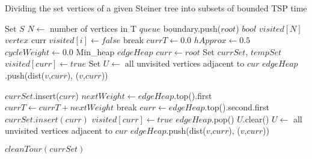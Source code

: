 \begin{algorithm}
\caption{Dividing the set vertices of a given Steiner tree into subsets of bounded TSP time}\label{euclid}
\begin{algorithmic}
\State Set  $S$
\State $N \gets$ number of vertices in T
\State $queue$ boundary.push($root$) 
\State $bool$ $visited[N]$
\State $vertex$ curr 
	\State $visited[i] \gets false$ 
\EndFor
{}
		\State break
	\EndIf
	\State $currT \gets 0.0$ 
	\State $hApprox \gets 0.5$ 
	\State $cycleWeight \gets 0.0$ 
	\State Min\_heap $edgeHeap$  
	\State $curr \gets root$ 
	\State Set $currSet$, $tempSet$ 
	\State $visited[curr] \gets true$ 
	\State Set $U \gets$ all unvisited vertices adjacent to $cur$ 
		\State $edgeHeap$.push(dist($v$,$curr$), ($v$,$curr$)) 
	\EndFor

	\State $currSet$.insert($curr$) 
		\State $nextWeight \gets edgeHeap$.top().first 
		\State $currT \gets currT + nextWeight$ 
			break 
		\EndIf
		\State $curr \gets edgeHeap$.top().second.first 
		\State $currSet.insert(curr)$ 
		\State $visited[curr] \gets true$ 
		\State $edgeHeap$.pop() 
		\State $U$.clear() 
		\State $U \gets$ all unvisited vertices adjacent to $cur$ 
			\State $edgeHeap$.push(dist($v$,$curr$), ($v$,$curr$)) 
		\EndFor
	\EndWhile

	\State $cleanTour(currSet)$
\end{algorithmic}
\end{algorithm}

